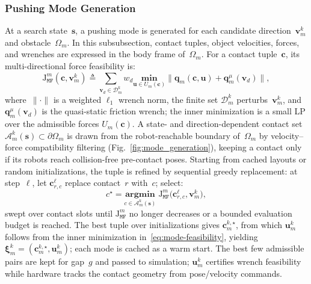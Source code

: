 \subsubsection{Pushing Mode Generation}
At a search state~$\mathbf{s}$, a pushing mode is generated for each candidate
direction~$\mathbf{v}_m^k$ and obstacle~$\Omega_m$. In this subsubsection,
contact tuples, object velocities, forces, and wrenches are expressed in the
body frame of~$\Omega_m$. For a contact tuple~$\mathbf{c}$, its
multi-directional force feasibility is:
\begin{equation}\label{eq:mode-feasibility}
\mathrm{J}_{\texttt{MF}}^m(\mathbf{c},\mathbf{v}_m^k)
\triangleq
\sum_{\mathbf{v}_d\in\mathcal{D}_m^k} w_d
\underset{\mathbf{u}\in{U}_m(\mathbf{c})}{\textbf{min}}
\|
\mathbf{q}_m(\mathbf{c},\mathbf{u})
+\mathbf{q}_m^\mu(\mathbf{v}_d)
\| ,
\end{equation}
where~$\|\cdot\|$ is a weighted $\ell_1$ wrench norm, the finite set
$\mathcal{D}_m^k$ perturbs~$\mathbf{v}_m^k$, and
$\mathbf{q}_m^\mu(\mathbf{v}_d)$ is the quasi-static friction wrench; the inner
minimization is a small LP over the admissible forces ${U}_m(\mathbf{c})$.
A state- and direction-dependent contact set
$\mathcal{A}_m^k(\mathbf{s})\subset\partial\Omega_m$ is drawn from the
robot-reachable boundary of~$\Omega_m$ by velocity--force compatibility
filtering (Fig.~\ref{fig:mode_generation}), keeping a contact only if its
robots reach collision-free pre-contact poses. Starting from cached layouts or
random initializations, the tuple is refined by sequential greedy replacement:
at step~$\ell$, let $\mathbf{c}_{r,c}^{\ell}$ replace contact~$r$
with~$c$; select:
\begin{equation}
c^\star
=
\underset{c\in\mathcal{A}_m^k(\mathbf{s})}{\textbf{argmin}}\;
\mathrm{J}_{\texttt{MF}}^m
\bigl(\mathbf{c}_{r,c}^{\ell},\mathbf{v}_m^k\bigr),
\label{eq:greedy_mode_update}
\end{equation}
swept over contact slots until $\mathrm{J}_{\texttt{MF}}^m$ no longer
decreases or a bounded evaluation budget is reached.
The best tuple over initializations gives
$\mathbf{c}_m^{k,\star}$, from which $\mathbf{u}_m^k$ follows from the inner
minimization in~\eqref{eq:mode-feasibility}, yielding
$\boldsymbol{\xi}_m^k=(\mathbf{c}_m^{k,\star},\mathbf{u}_m^k)$; each mode is
cached as a warm start.  The best few admissible pairs are kept for gap~$g$ and
passed to simulation; $\mathbf{u}_m^k$ certifies wrench feasibility while
hardware tracks the contact geometry from pose/velocity commands.


